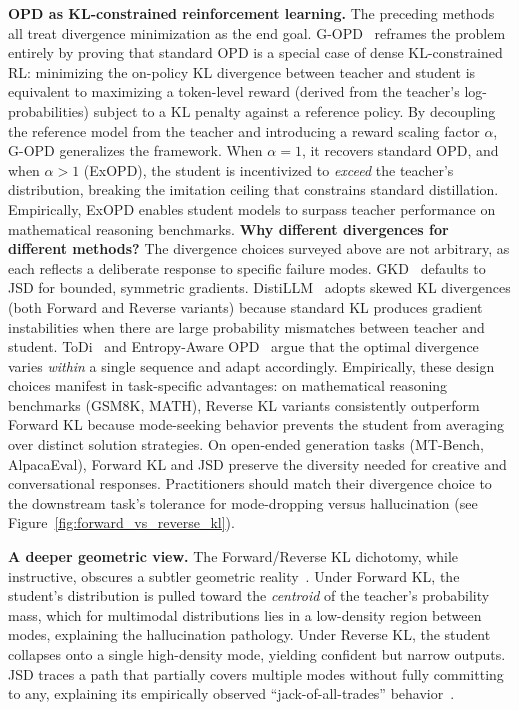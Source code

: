 \documentclass{article} %
\begin{document}
\textbf{OPD as KL-constrained reinforcement learning.}
The preceding methods all treat divergence minimization as the end goal. G-OPD~\citep{2602.12125} reframes the problem entirely by proving that standard OPD is a special case of dense KL-constrained RL: minimizing the on-policy KL divergence between teacher and student is equivalent to maximizing a token-level reward (derived from the teacher's log-probabilities) subject to a KL penalty against a reference policy. By decoupling the reference model from the teacher and introducing a reward scaling factor $\alpha$, G-OPD generalizes the framework. When $\alpha = 1$, it recovers standard OPD, and when $\alpha > 1$ (ExOPD), the student is incentivized to \emph{exceed} the teacher's distribution, breaking the imitation ceiling that constrains standard distillation. Empirically, ExOPD enables student models to surpass teacher performance on mathematical reasoning benchmarks.
\textbf{Why different divergences for different methods?}
The divergence choices surveyed above are not arbitrary, as each reflects a deliberate response to specific failure modes. GKD~\citep{2306.13649} defaults to JSD for bounded, symmetric gradients. DistiLLM~\citep{2402.03898} adopts skewed KL divergences (both Forward and Reverse variants) because standard KL produces gradient instabilities when there are large probability mismatches between teacher and student. ToDi~\citep{2505.16297} and Entropy-Aware OPD~\citep{2603.07079} argue that the optimal divergence varies \emph{within} a single sequence and adapt accordingly. Empirically, these design choices manifest in task-specific advantages: on mathematical reasoning benchmarks (GSM8K, MATH), Reverse KL variants consistently outperform Forward KL because mode-seeking behavior prevents the student from averaging over distinct solution strategies. On open-ended generation tasks (MT-Bench, AlpacaEval), Forward KL and JSD preserve the diversity needed for creative and conversational responses. Practitioners should match their divergence choice to the downstream task's tolerance for mode-dropping versus hallucination (see Figure~\ref{fig:forward_vs_reverse_kl}).

\textbf{A deeper geometric view.}
The Forward/Reverse KL dichotomy, while instructive, obscures a subtler geometric reality~\citep{2404.02657,2402.11890}. Under Forward KL, the student's distribution is pulled toward the \emph{centroid} of the teacher's probability mass, which for multimodal distributions lies in a low-density region between modes, explaining the hallucination pathology. Under Reverse KL, the student collapses onto a single high-density mode, yielding confident but narrow outputs. JSD traces a path that partially covers multiple modes without fully committing to any, explaining its empirically observed ``jack-of-all-trades'' behavior~\citep{2306.13649}.
\end{document}
